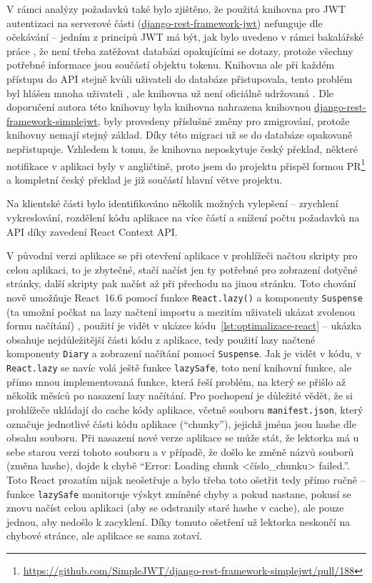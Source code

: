 V rámci analýzy požadavků také bylo zjištěno, že použitá knihovna pro JWT autentizaci na serverové části (\href{https://github.com/jpadilla/django-rest-framework-jwt}{django-rest-framework-jwt}) nefunguje dle očekávání -- jedním z principů JWT má být, jak bylo uvedeno v rámci bakalářské práce \cite{bp}, že není třeba zatěžovat databázi opakujícími se dotazy, protože všechny potřebné informace jsou součástí objektu tokenu. Knihovna ale při každém přístupu do API stejně kvůli uživateli do databáze přistupovala, tento problém byl hlášen mnoha uživateli \cite{django-rest-framework-jwt-issue}, ale knihovna už není oficiálně udržovaná \cite{django-rest-framework-jwt}. Dle doporučení autora této knihovny byla knihovna nahrazena knihovnou \href{https://github.com/SimpleJWT/django-rest-framework-simplejwt}{django-rest-framework-simplejwt}, byly provedeny příslušné změny pro zmigrování, protože knihovny nemají stejný základ. Díky této migraci už se do databáze opakovaně nepřistupuje. Vzhledem k tomu, že knihovna neposkytuje český překlad, některé notifikace v aplikaci byly v angličtině, proto jsem do projektu přispěl formou PR\footnote{\url{https://github.com/SimpleJWT/django-rest-framework-simplejwt/pull/188}} a kompletní český překlad je již součástí hlavní větve projektu.

Na klientské části bylo identifikováno několik možných vylepšení -- zrychlení vykreslování, rozdělení kódu aplikace na více částí a snížení počtu požadavků na API díky zavedení React Context API.

V původní verzi aplikace se při otevření aplikace v prohlížeči načtou skripty pro celou aplikaci, to je zbytečné, stačí načíst jen ty potřebné pro zobrazení dotyčné stránky, další skripty pak načíst až při přechodu na jinou stránku. Toto chování nově umožňuje React~16.6 pomocí funkce \verb|React.lazy()| a komponenty \verb|Suspense| (ta umožní počkat na lazy načtení importu a mezitím uživateli ukázat zvolenou formu načítání) \cite{react-blog-166}, použití je vidět v ukázce kódu~\ref{lst:optimalizace-react} -- ukázka obsahuje nejdůležitější části kódu z aplikace, tedy použití lazy načtené komponenty \verb|Diary| a zobrazení načítání pomocí \verb|Suspense|. Jak je vidět v kódu, v \verb|React.lazy| se navíc volá ještě funkce \verb|lazySafe|, toto není knihovní funkce, ale přímo mnou implementovaná funkce, která řeší problém, na který se přišlo až několik měsíců po nasazení lazy načítání. Pro pochopení je důležité vědět, že si prohlížeče ukládají do cache kódy aplikace, včetně souboru \verb|manifest.json|, který označuje jednotlivé části kódu aplikace (\enquote{chunky}), jejichž jména jsou hashe dle obsahu souboru. Při nasazení nové verze aplikace se může stát, že lektorka má u sebe starou verzi tohoto souboru a v případě, že došlo ke změně názvů souborů (změna hashe), dojde k chybě \enquote{Error: Loading chunk <číslo\_chunku> failed.}. Toto React prozatím nijak neošetřuje a bylo třeba toto ošetřit tedy přímo ručně -- funkce \verb|lazySafe| monitoruje výskyt zmíněné chyby a pokud nastane, pokusí se znovu načíst celou aplikaci (aby se odstranily staré hashe v cache), ale pouze jednou, aby nedošlo k zacyklení. Díky tomuto ošetření už lektorka neskončí na chybové stránce, ale aplikace se sama zotaví.

